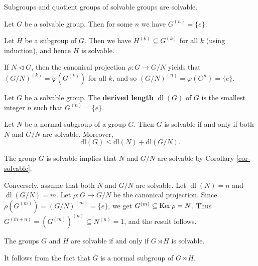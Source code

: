 \begin{corollary} \label{cor-solvable}
	Subgroups and quotient groups of solvable groups are solvable.
\end{corollary}
\begin{sketch}
	Let $G$ be a solvable group. Then for some $n$ we have $G^{(n)} = \{e\}$.
	
	Let $H$ be a subgroup of  $G$. Then we have $H^{(k)} \subseteq G^{(k)}$ for all $k$ (using induction), and hence $H$ is solvable.
	
	If $N \lhd G$, then the canonical projection $\rho : G \rightarrow G/N$ yields that $(G/N)^{(k)} = \varphi(G^{(k)})$ for all $k$, and so   $(G/N)^{(n)} = \varphi(G^{n}) =\{e\}$.
\end{sketch}

\begin{definition}
	Let $G$ be a  solvable group. The \textbf{derived length} $\operatorname{dl}(G)$ of $G$ is the smallest integer $n$ such that $G^{(n)} = \{e\}$.
\end{definition}


\begin{proposition} \label{prop-solv-iff-normal-and-quotient-solv}
	Let $N$ be a normal subgroup of  a group $G$. Then $G$ is solvable if and only if both $N$ and $G/N$ are solvable. Moreover, $$\text{dl}(G) \leq \text{dl}(N) + \text{dl}(G/N).$$
\end{proposition}
\begin{sketch}
	The group $G$ is solvable implies that $N$ and $G/N$ are solvable by Corollary \ref{cor-solvable}.
	
	Conversely, assume that both $N$ and $G/N$ are solvable. Let $\operatorname{dl}(N) = n$ and $\operatorname{dl}(G/N) = m$. Let  $\rho:G \rightarrow G/N$ be the canonical projection. Since $\rho(G^{(m)}) = (G/N)^{(m)} = \{e\}$, we get $G^{(m)} \subseteq \operatorname{Ker} \rho = N$. Thus $G^{(m+n)} = (G^{(m)})^{(n)} \subseteq N^{(n)} = 1$, and the result follows.
\end{sketch}

\begin{corollary}
The groups $G$ and $H$ are solvable if and only if $G\rtimes H$ is solvable.
\end{corollary}
\begin{sketch}
	It follows from the fact that $\overline{G}$ is a normal subgroup of  $G\rtimes H$. 
\end{sketch}


